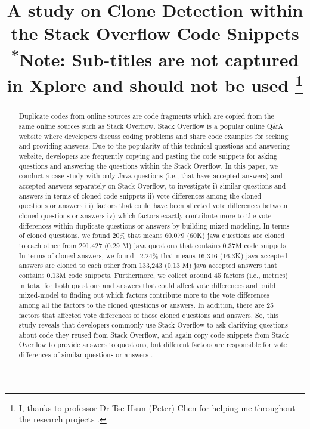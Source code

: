 \documentclass[conference]{IEEEtran}
\begin{document}
	
	\title{A study on Clone Detection within the Stack Overflow Code Snippets\\
		{\footnotesize \textsuperscript{*}Note: Sub-titles are not captured in Xplore and
			should not be used}
		\thanks{I, thanks to professor Dr Tse-Hsun (Peter) Chen for helping me throughout the research projects .}
	}
	
	\author{
	}
	
	\maketitle
	
	\begin{abstract}
		Duplicate codes from online sources are code fragments which are copied from the same online sources such as Stack Overflow. Stack Overflow is a popular online Q\&A website where developers discuss coding problems and share code examples for seeking and providing answers. Due to the popularity of this technical questions and answering website, developers are frequently copying and pasting the code snippets for asking questions and answering the questions within the Stack Overflow. In this paper, we conduct a case study with only Java questions (i.e., that have accepted answers) and accepted answers separately on Stack Overflow, to investigate i) similar questions and answers in terms of cloned code snippets ii) vote differences among the cloned  questions or answers iii) factors that could have been affected vote differences between cloned questions or answers iv) which factors exactly contribute more to the vote differences within duplicate questions or answers by building mixed-modeling. In terms of cloned questions, we found 20\% that means 60,079 (60K) java questions are cloned to each other from 291,427 (0.29 M) java questions that contains 0.37M code snippets. In terms of cloned answers, we found 12.24\% that means 16,316 (16.3K) java accepted answers are cloned to each other from 133,243 (0.13 M) java accepted answers that contains 0.13M code snippets. Furthermore, we collect around 45 factors (i.e., metrics)  in total for both questions and answers that could affect vote differences and build mixed-model to finding out which factors contribute more to the vote differences among all the factors to the cloned questions or answers. In addition, there are 25 factors that affected vote differences of those cloned questions and answers. So, this study reveals that developers commonly use Stack Overflow to ask clarifying questions about code they reused from Stack Overflow, and again copy code snippets from Stack Overflow to provide answers to questions, but different factors are responsible for vote differences of similar questions or answers . 
		
	\end{abstract}
	
\end{document}
